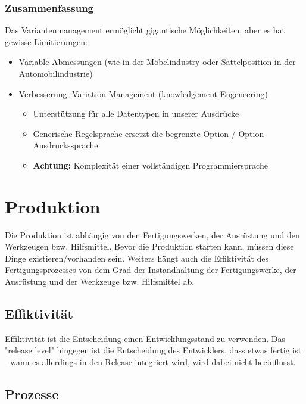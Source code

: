 \subsection{Zusammenfassung}
Das Variantenmanagement ermöglicht gigantische Möglichkeiten, aber es hat gewisse Limitierungen:

\begin{itemize}
\item Variable Abmessungen (wie in der Möbelindustry oder Sattelposition in der Automobilindustrie)
\item {
Verbesserung: Variation Management (knowledgement Engeneering)
\begin{itemize}
\item Unterstützung für alle Datentypen in unserer Ausdrücke
\item Generische Regelsprache ersetzt die begrenzte Option / Option Ausdruckssprache
\item \textbf{Achtung:} Komplexität einer vollständigen Programmiersprache
\end{itemize}
}
\end{itemize}

\chapter{Produktion}
Die Produktion ist abhängig von den Fertigungswerken, der Ausrüstung und den Werkzeugen bzw. Hilfsmittel. Bevor die Produktion starten kann, müssen diese Dinge existieren/vorhanden sein. Weiters hängt auch die Effiktivität des Fertigungsprozesses von dem Grad der Instandhaltung der Fertigungswerke, der Ausrüstung und der Werkzeuge bzw. Hilfsmittel ab.


\section{Effiktivität}
Effiktivität ist die Entscheidung einen Entwicklungsstand zu verwenden. Das "release level" hingegen ist die Entscheidung des Entwicklers, dass etwas fertig ist - wann es allerdings in den Release integriert wird, wird dabei nicht beeinflusst. 


\section{Prozesse}
